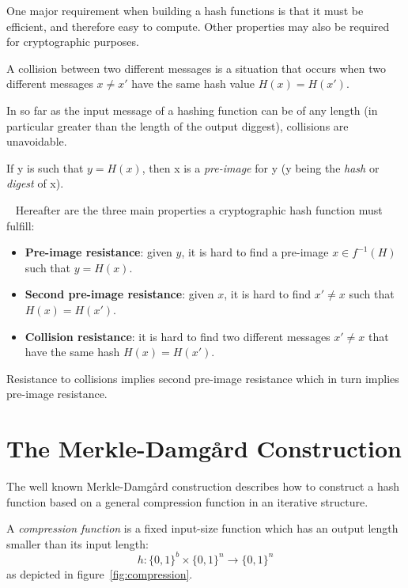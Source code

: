 One major requirement when building a hash functions is that it must be efficient, and therefore easy to compute. 
Other properties may also be required for cryptographic purposes.

\begin{defn}A collision between two different messages is a situation that occurs when two different messages $x \ne x'$ have the same hash value $H(x) = H(x')$.
\end{defn}
\begin{rem}
In so far as the input message of a hashing function can be of any length (in particular greater than the length of the output diggest), collisions are unavoidable.
\end{rem}
\begin{defn}
If y is such that $y = H(x)$, then x is a \emph{pre-image} for y (y being the \emph{hash} or \emph{digest}  of x).
\end{defn}

\begin{defn}~\label{def:sec_prop}
Hereafter are the three main properties a cryptographic hash function must fulfill:
\begin{itemize}
\item \textbf{Pre-image resistance}:  given $y$, it is hard to find a pre-image $x \in f^{-1}(H)$ such that $y = H(x)$.
\item \textbf{Second pre-image resistance}: given $x$, it is hard to find $x' \ne x$ such that $H(x) = H(x')$.
\item \textbf{Collision resistance}: it is hard to find two different messages $x' \ne x$ that have the same hash $H(x) = H(x')$.
\end{itemize}
\end{defn}

\begin{prop}Resistance to collisions implies second pre-image resistance which in turn implies pre-image resistance.
\end{prop}


\section{The Merkle-Damg\r{a}rd Construction}\label{sec:MerkleDamg}

The well known Merkle-Damg\r{a}rd construction describes how to construct a hash function based on a general compression function in an iterative structure. 

\begin{defn}A \emph{compression function} is a fixed input-size function which has an output length smaller than its input length: 
$$h:{\{0,1\}}^b ×{\{0,1\}}^n \rightarrow {\{0,1\}}^n$$
as depicted in figure~\ref{fig:compression}.
\end{defn}

